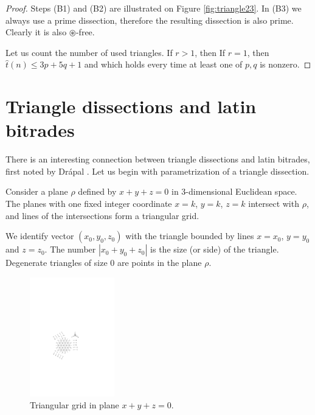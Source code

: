 \begin{proof}
Steps (B1) and (B2) are illustrated on Figure \ref{fig:triangle23}. In (B3) we always use a prime dissection, therefore the resulting dissection is also prime. Clearly it is also $\circledast$-free.

Let us count the number of used triangles. If $r > 1$, then
If $r=1$, then $\hat t(n) \leq 3p + 5q + 1$ and
which holds every time at least one of $p,q$ is nonzero.
\end{proof}

\section{Triangle dissections and latin bitrades}

There is an interesting connection between triangle dissections and latin bitrades, first noted by Drápal \cite{Drapal91}. Let us begin with parametrization of a triangle dissection.

Consider a plane $\rho$ defined by $x+y+z=0$ in 3-dimensional Euclidean space. The planes with one fixed integer coordinate $x=k$, $y=k$, $z=k$ intersect with $\rho$, and lines of the intersections form a triangular grid.

We identify vector $(x_0, y_0, z_0)$ with the triangle bounded by lines $x=x_0$, $y=y_0$ and $z=z_0$. The number $|x_0+y_0+z_0|$ is the size (or side) of the triangle. Degenerate triangles of size 0 are points in the plane $\rho$.

\begin{figure}[htb]
\centering
\includegraphics[height=14em]{img/trigrid.pdf}
\caption{Triangular grid in plane $x+y+z=0$.}
\label{fig:trigrid}
\end{figure}

